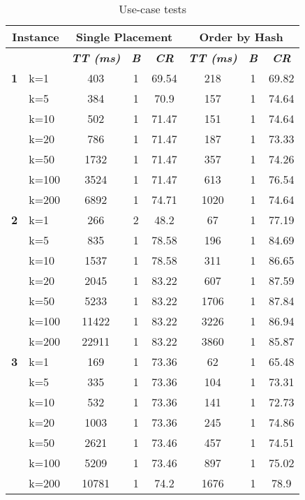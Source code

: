     \begin{table}[htbp]
    \caption{Use-case tests}
    \begin{tabular}{|l|l|c|c|c|c|c|c|}
    
    \multicolumn{ 2}{|c|}{\textbf{Instance}} & \multicolumn{ 3}{c|}{\textbf{Single Placement}} & \multicolumn{ 3}{c|}{\textbf{Order by Hash}} \\ \hline
    \multicolumn{ 2}{|l|}{} & \textbf{\textit{TT (ms)}} & \textbf{\textit{B}} & \textbf{\textit{CR}} & \textbf{\textit{TT (ms)}} & \textbf{\textit{B}} & \textbf{\textit{CR}} \\ \hline
    \multicolumn{1}{|r|}{\textbf{1}} & k=1 & 403 & 1 & 69.54 & 218 & 1 & 69.82 \\ 
     & k=5 & 384 & 1 & 70.9 & 157 & 1 & 74.64 \\ 
     & k=10 & 502 & 1 & 71.47 & 151 & 1 & 74.64 \\ 
     & k=20 & 786 & 1 & 71.47 & 187 & 1 & 73.33 \\ 
     & k=50 & 1732 & 1 & 71.47 & 357 & 1 & 74.26 \\ 
     & k=100 & 3524 & 1 & 71.47 & 613 & 1 & 76.54 \\ 
     & k=200 & 6892 & 1 & 74.71 & 1020 & 1 & 74.64 \\ \hline
    \multicolumn{1}{|r|}{\textbf{2}} & k=1 & 266 & 2 & 48.2 & 67 & 1 & 77.19 \\ 
     & k=5 & 835 & 1 & 78.58 & 196 & 1 & 84.69 \\ 
     & k=10 & 1537 & 1 & 78.58 & 311 & 1 & 86.65 \\ 
     & k=20 & 2045 & 1 & 83.22 & 607 & 1 & 87.59 \\ 
     & k=50 & 5233 & 1 & 83.22 & 1706 & 1 & 87.84 \\ 
     & k=100 & 11422 & 1 & 83.22 & 3226 & 1 & 86.94 \\ 
     & k=200 & 22911 & 1 & 83.22 & 3860 & 1 & 85.87 \\ \hline
    \multicolumn{1}{|r|}{\textbf{3}} & k=1 & 169 & 1 & 73.36 & 62 & 1 & 65.48 \\ 
     & k=5 & 335 & 1 & 73.36 & 104 & 1 & 73.31 \\ 
     & k=10 & 532 & 1 & 73.36 & 141 & 1 & 72.73 \\ 
     & k=20 & 1003 & 1 & 73.36 & 245 & 1 & 74.86 \\ 
     & k=50 & 2621 & 1 & 73.46 & 457 & 1 & 74.51 \\ 
     & k=100 & 5209 & 1 & 73.46 & 897 & 1 & 75.02 \\ 
     & k=200 & 10781 & 1 & 74.2 & 1676 & 1 & 78.9 \\ \hline

\end{tabular}
\end{table}
